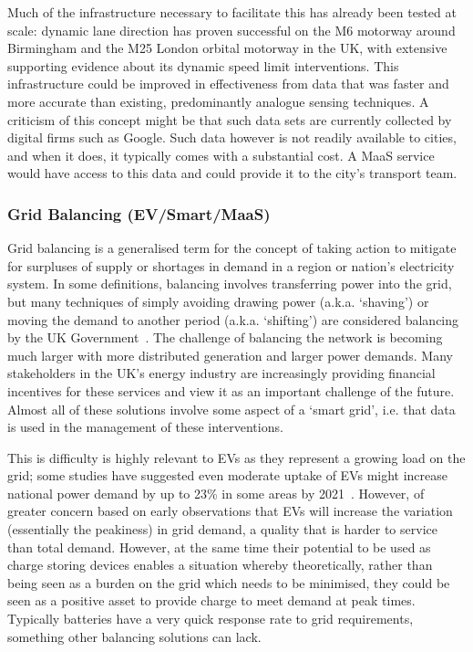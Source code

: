 \documentclass[b5paper,10pt]{article}
\begin{document}
Much of the infrastructure necessary to facilitate this has already
been tested at scale: dynamic lane direction has proven successful on
the M6 motorway around Birmingham and the M25 London orbital motorway
in the UK, with extensive supporting evidence about its dynamic speed
limit interventions. This infrastructure could be improved in
effectiveness from data that was faster and more accurate than
existing, predominantly analogue sensing techniques.  A criticism of
this concept might be that such data sets are currently collected by
digital firms such as Google. Such data however is not readily
available to cities, and when it does, it typically comes with a
substantial cost. A MaaS service would have access to this data and
could provide it to the city's transport team.


\subsubsection{Grid Balancing (EV/Smart/MaaS)} 

Grid balancing is a generalised term for the concept of taking action
to mitigate for surpluses of supply or shortages in demand in a region
or nation’s electricity system. In some definitions, balancing
involves transferring power into the grid, but many techniques of
simply avoiding drawing power (a.k.a. `shaving') or moving the demand
to another period (a.k.a. `shifting') are considered balancing by the
UK Government~\citep{decc:2014}. The challenge of balancing the network
is becoming much larger with more distributed generation and larger
power demands. Many stakeholders in the UK's energy industry are
increasingly providing financial incentives for these services and
view it as an important challenge of the future. Almost all of these
solutions involve some aspect of a `smart grid', i.e. that data is
used in the management of these interventions.

This is difficulty is highly relevant to EVs as they represent a
growing load on the grid; some studies have suggested even moderate
uptake of EVs might increase national power demand by up to 23\% in
some areas by 2021~\citep{paffumi-et-al:2015}. However, of greater
concern based on early observations that EVs will increase the
variation (essentially the peakiness) in grid demand, a quality that
is harder to service than total demand. However, at the same time
their potential to be used as charge storing devices enables a
situation whereby theoretically, rather than being seen as a burden on
the grid which needs to be minimised, they could be seen as a positive
asset to provide charge to meet demand at peak times. Typically
batteries have a very quick response rate to grid requirements,
something other balancing solutions can lack.
\end{document}
